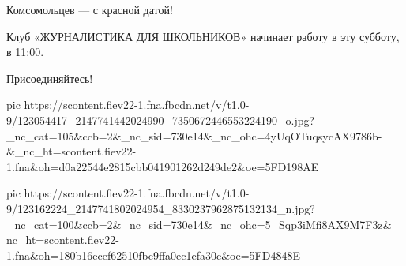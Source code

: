 Комсомольцев --- с красной датой!

Клуб «ЖУРНАЛИСТИКА ДЛЯ ШКОЛЬНИКОВ» начинает работу в эту субботу, в 11:00.

Присоединяйтесь!

\ifcmt
pic https://scontent.fiev22-1.fna.fbcdn.net/v/t1.0-9/123054417_2147741442024990_7350672446553224190_o.jpg?_nc_cat=105&ccb=2&_nc_sid=730e14&_nc_ohc=4yUqOTuqsycAX9786b-&_nc_ht=scontent.fiev22-1.fna&oh=d0a22544e2815cbb041901262d249de2&oe=5FD198AE

pic https://scontent.fiev22-1.fna.fbcdn.net/v/t1.0-9/123162224_2147741802024954_8330237962875132134_n.jpg?_nc_cat=100&ccb=2&_nc_sid=730e14&_nc_ohc=5_Sqp3iMfi8AX9M7F3z&_nc_ht=scontent.fiev22-1.fna&oh=180b16ecef62510fbc9ffa0ec1efa30c&oe=5FD4848E
\fi
